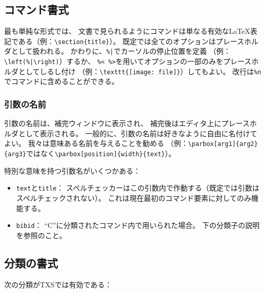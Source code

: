 \subsection{コマンド書式}

最も単純な形式では、
文書で見られるようにコマンドは単なる有効なLaTeX表記である（例：\verb+\section{title}+）。
既定では全てのオプションはプレースホルダとして扱われる。
かわりに、\verb+%|+でカーソルの停止位置を定義
（例：\verb+\left(%|\right)+）するか、
\verb+%< %>+を用いてオプションの一部のみをプレースホルダとしてしるし付け
（例：\verb+\texttt{[image: file]}+）してもよい。
改行は\verb+%n+でコマンドに含めることができる。

\subsubsection{引数の名前}

引数の名前は、補完ウィンドウに表示され、
補完後はエディタ上にプレースホルダとして表示される。
一般的に、引数の名前は好きなように自由に名付けてよい。
我々は意味ある名前を与えることを勧める
（例：\verb+\parbox[arg1]{arg2}{arg3}+ではなく\verb+\parbox[position]{width}{text}+）。

特別な意味を持つ引数名がいくつかある：

\begin{itemize}
\item
  \verb+text+と\verb+title+：
  スペルチェッカーはこの引数内で作動する（既定では引数はスペルチェックされない）。
  これは現在最初のコマンド要素に対してのみ機能する。
\item
  \verb+bibid+： ``C''に分類されたコマンド内で用いられた場合。
  下の分類子の説明を参照のこと。
\end{itemize}

\subsection{分類の書式}

次の分類がTXSでは有効である：

